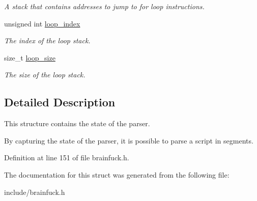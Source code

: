 \begin{DoxyCompactItemize}
\begin{DoxyCompactList}\small\item\em A stack that contains addresses to jump to for loop instructions. \end{DoxyCompactList}\item 
\hypertarget{structBrainfuckParserContext_a7cf7098e3c4aee0f7ad04e4af1ec5e38}{}unsigned int \hyperlink{structBrainfuckParserContext_a7cf7098e3c4aee0f7ad04e4af1ec5e38}{loop\+\_\+index}\label{structBrainfuckParserContext_a7cf7098e3c4aee0f7ad04e4af1ec5e38}

\begin{DoxyCompactList}\small\item\em The index of the loop stack. \end{DoxyCompactList}\item 
\hypertarget{structBrainfuckParserContext_a6f9d032c72e40e19ed1be58193564c81}{}size\+\_\+t \hyperlink{structBrainfuckParserContext_a6f9d032c72e40e19ed1be58193564c81}{loop\+\_\+size}\label{structBrainfuckParserContext_a6f9d032c72e40e19ed1be58193564c81}

\begin{DoxyCompactList}\small\item\em The size of the loop stack. \end{DoxyCompactList}\end{DoxyCompactItemize}


\subsection{Detailed Description}
This structure contains the state of the parser. 

By capturing the state of the parser, it is possible to parse a script in segments. 

Definition at line 151 of file brainfuck.\+h.



The documentation for this struct was generated from the following file\+:\begin{DoxyCompactItemize}
\item 
include/brainfuck.\+h\end{DoxyCompactItemize}
